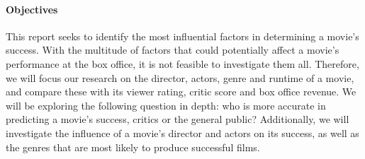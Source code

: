\begin{multicols}{2}
        \paragraph{Objectives}
            This report seeks to identify the most influential factors in determining a
                movie's success.
            With the multitude of factors that could potentially affect a movie's
                performance at the box office, it is not feasible to investigate them all.
            Therefore, we will focus our research on the director, actors, genre and
                runtime of a movie, and compare these with its viewer rating, critic score and
                box office revenue.
            We will be exploring the following question in depth: who is more accurate in
                predicting a movie's success, critics or the general public?
            Additionally, we will investigate the influence of a movie's director and
                actors on its success, as well as the genres that are most likely to produce
                successful films.
    \end{multicols}
